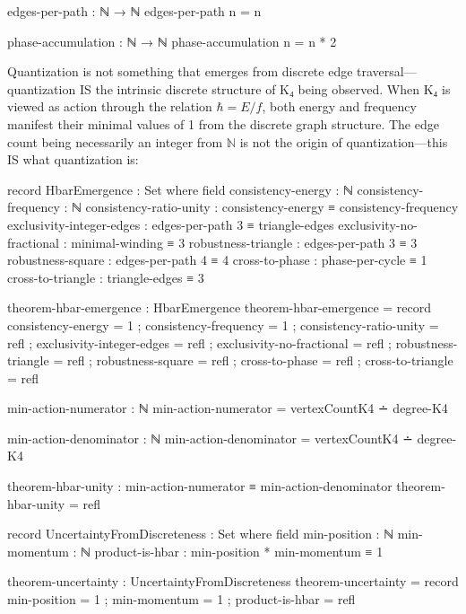 \documentclass[11pt,a4paper]{book}
\begin{document}
\begin{code}
edges-per-path : ℕ → ℕ
edges-per-path n = n

phase-accumulation : ℕ → ℕ
phase-accumulation n = n * 2
\end{code}

Quantization is not something that emerges from discrete edge traversal—quantization IS the intrinsic discrete structure of K₄ being observed. When K₄ is viewed as action through the relation $\hbar = E/f$, both energy and frequency manifest their minimal values of 1 from the discrete graph structure. The edge count being necessarily an integer from $\mathbb{N}$ is not the origin of quantization—this IS what quantization is:

\begin{code}
record HbarEmergence : Set where
  field
    consistency-energy    : ℕ
    consistency-frequency : ℕ
    consistency-ratio-unity : consistency-energy ≡ consistency-frequency
    exclusivity-integer-edges : edges-per-path 3 ≡ triangle-edges
    exclusivity-no-fractional : minimal-winding ≡ 3
    robustness-triangle : edges-per-path 3 ≡ 3
    robustness-square : edges-per-path 4 ≡ 4
    cross-to-phase : phase-per-cycle ≡ 1
    cross-to-triangle : triangle-edges ≡ 3

theorem-hbar-emergence : HbarEmergence
theorem-hbar-emergence = record
  { consistency-energy = 1
  ; consistency-frequency = 1
  ; consistency-ratio-unity = refl
  ; exclusivity-integer-edges = refl
  ; exclusivity-no-fractional = refl
  ; robustness-triangle = refl
  ; robustness-square = refl
  ; cross-to-phase = refl
  ; cross-to-triangle = refl
  }

min-action-numerator : ℕ
min-action-numerator = vertexCountK4 ∸ degree-K4

min-action-denominator : ℕ  
min-action-denominator = vertexCountK4 ∸ degree-K4

theorem-hbar-unity : min-action-numerator ≡ min-action-denominator
theorem-hbar-unity = refl
\end{code}

\begin{code}
record UncertaintyFromDiscreteness : Set where
  field
    min-position : ℕ
    min-momentum : ℕ
    product-is-hbar : min-position * min-momentum ≡ 1

theorem-uncertainty : UncertaintyFromDiscreteness
theorem-uncertainty = record
  { min-position = 1
  ; min-momentum = 1
  ; product-is-hbar = refl
  }
\end{code}
\end{document}
